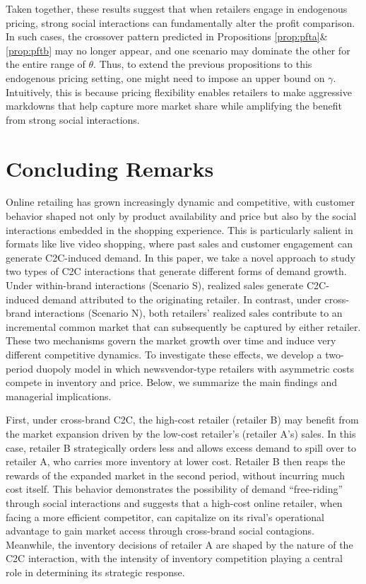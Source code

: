 \documentclass[nonblindrev,copyedit]{informs1}
\begin{document}
Taken together, these results suggest that when retailers engage in endogenous pricing, strong social interactions can fundamentally alter the profit comparison. In such cases, the crossover pattern predicted in Propositions \ref{prop:pfta}\&\ref{prop:pftb} may no longer appear, and one scenario may dominate the other for the entire range of $\theta$. Thus, to extend the previous propositions to this endogenous pricing setting, one might need to impose an upper bound on $\gamma$. Intuitively, this is because pricing flexibility enables retailers to make aggressive markdowns that help capture more market share while amplifying the benefit from strong social interactions.

\section{Concluding Remarks}\label{sec:con}

Online retailing has grown increasingly dynamic and competitive, with customer behavior shaped not only by product availability and price but also by the social interactions embedded in the shopping experience. This is particularly salient in formats like live video shopping, where past sales and customer engagement can generate C2C-induced demand. In this paper, we take a novel approach to study two types of C2C interactions that generate different forms of demand growth. Under within-brand interactions (Scenario S), realized sales generate C2C-induced demand attributed to the originating retailer. In contrast, under cross-brand interactions (Scenario N), both retailers’ realized sales contribute to an incremental common market that can subsequently be captured by either retailer. These two mechanisms govern the market growth over time and induce very different competitive dynamics.
To investigate these effects, we develop a two-period duopoly model in which newsvendor-type retailers with asymmetric costs compete in inventory and price. Below, we summarize the main findings and managerial implications.

First, under cross-brand C2C, the high-cost retailer (retailer B) may benefit from the market expansion driven by the low-cost retailer's (retailer A's) sales. In this case, retailer B strategically orders less and allows excess demand to spill over to retailer A, who carries more inventory at lower cost. Retailer B then reaps the rewards of the expanded market in the second period, without incurring much cost itself. This behavior demonstrates the possibility of demand ``free-riding'' through social interactions and suggests that a high-cost online retailer, when facing a more efficient competitor, can capitalize on its rival's operational advantage to gain market access through cross-brand social contagions. Meanwhile, the inventory decisions of retailer A are shaped by the nature of the C2C interaction, with the intensity of inventory competition playing a central role in determining its strategic response.
\end{document}
